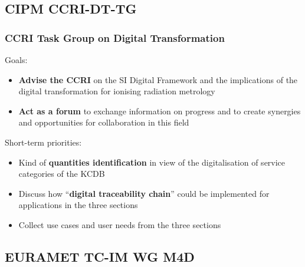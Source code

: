\documentclass{beamer}
\begin{document}
    \subsection{CIPM CCRI-DT-TG}

    \begin{frame}
        \frametitle{CCRI Task Group on Digital Transformation}
        Goals:
        \begin{itemize}
            \item \textbf{Advise the CCRI} on the SI Digital Framework and the implications of the digital transformation for ionising radiation metrology
            \item \textbf{Act as a forum} to exchange information on progress and to create synergies and opportunities for collaboration in this field
        \end{itemize}
        Short-term priorities:
        \begin{itemize}
            \item Kind of \textbf{quantities identification} in view of the digitalisation of service categories of the KCDB
            \item Discuss how “\textbf{digital traceability chain}” could be implemented for applications in the three sections
            \item Collect use cases and user needs from the three sections
        \end{itemize}
    \end{frame}

    \subsection{EURAMET TC-IM WG M4D}
\end{document}
